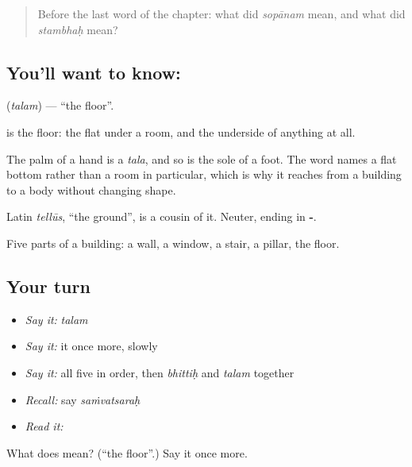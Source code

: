 \begin{quote}
Before the last word of the chapter: what did \emph{sopānam} mean, and what did \emph{stambhaḥ} mean?
\end{quote}

\subsection*{You'll want to know: }
\textbf{} (\emph{talam}) — \textquotedblleft{}the floor\textquotedblright{}.

\textbf{} is the floor: the flat under a room, and the underside of anything at all.

The palm of a hand is a \emph{tala}, and so is the sole of a foot. The word names a flat bottom rather than a room in particular, which is why it reaches from a building to a body without changing shape.

Latin \emph{tellūs}, \textquotedblleft{}the ground\textquotedblright{}, is a cousin of it. Neuter, ending in \textbf{-}.

\begin{grammarlens}[title={What you've built}]
Five parts of a building: a wall, a window, a stair, a pillar, the floor.
\end{grammarlens}

\subsection*{Your turn}
\begin{itemize}
\raggedright
  \item \emph{Say it:} \emph{talam}
  \item \emph{Say it:} it once more, slowly
  \item \emph{Say it:} all five in order, then \emph{bhittiḥ} and \emph{talam} together
  \item \emph{Recall:} say \emph{saṁvatsaraḥ}
  \item \emph{Read it:} \textbf{}
\end{itemize}

\begin{tcolorbox}[breakable,colback=teal!4,colframe=teal!35!black,title={Before you move on}]
What does  mean? (\textquotedblleft{}the floor\textquotedblright{}.) Say it once more.
\end{tcolorbox}
